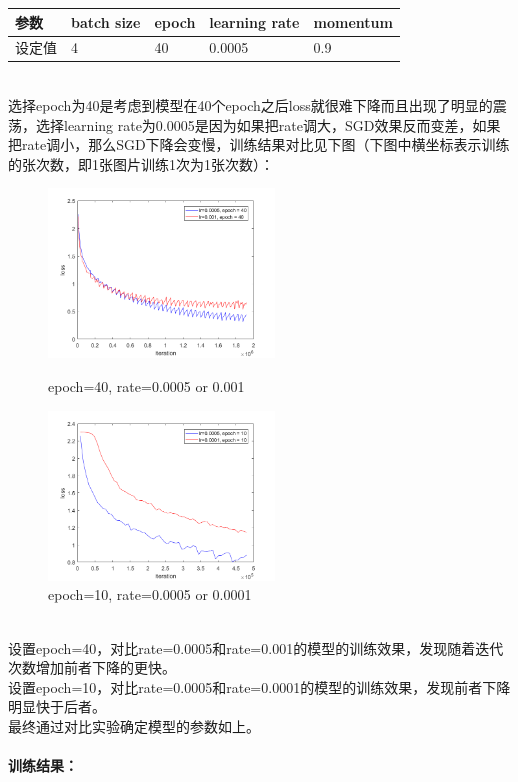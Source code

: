 \documentclass[a4paper,UTF8]{article}
\numberwithin{equation}{section}
\begin{document}
\begin{enumerate}
\begin{table}[h]
\begin{tabular}{|l|l|l|l|l|}
		参数	& batch size & epoch & learning rate & momentum \\ \hline
		设定值	& 4 & 40 & 0.0005 & 0.9 \\ \hline
	\end{tabular}
\end{table}\\
选择epoch为40是考虑到模型在40个epoch之后loss就很难下降而且出现了明显的震荡，选择learning rate为0.0005是因为如果把rate调大，SGD效果反而变差，如果把rate调小，那么SGD下降会变慢，训练结果对比见下图（下图中横坐标表示训练的张次数，即1张图片训练1次为1张次数）：
\begin{figure}[htbp]
	\centering
	\begin{minipage}[t]{0.48\textwidth}
		\centering
		\includegraphics[width=6cm]{net-0005-001-40.png}
		\caption{epoch=40, rate=0.0005 or 0.001}
	\end{minipage}
	\begin{minipage}[t]{0.48\textwidth}
		\centering
		\includegraphics[width=6cm]{net-0005-0001-10.png}
		\caption{epoch=10, rate=0.0005 or 0.0001}
	\end{minipage}
\end{figure}\\
设置epoch=40，对比rate=0.0005和rate=0.001的模型的训练效果，发现随着迭代次数增加前者下降的更快。\\
设置epoch=10，对比rate=0.0005和rate=0.0001的模型的训练效果，发现前者下降明显快于后者。\\
最终通过对比实验确定模型的参数如上。\\\\
\textbf{训练结果：}\\

\end{enumerate}
\end{document}
